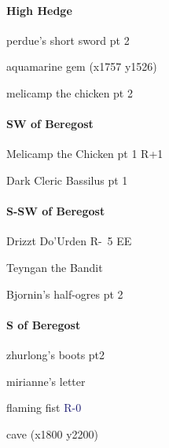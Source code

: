 \documentclass[10pt,a4,twoside]{book}
\begin{document}
\begin{multicols}{3}
\paragraph*{High Hedge}
\begin{trivlist}
\item perdue's short sword pt 2   \label{shsw} %
\item aquamarine gem (x1757 y1526)
\item melicamp the chicken pt 2   \label{wizard} %
\end{trivlist}

\paragraph*{SW of Beregost}
\begin{trivlist}
\item Melicamp the Chicken pt 1 {\textcolor{OliveGreen}{R+1}}  \label{chicken} %
\item Dark Cleric Bassilus pt 1   \label{bassilus} %
\end{trivlist}

\paragraph*{S-SW of Beregost}
\begin{trivlist}
\item Drizzt Do'Urden \textcolor{Mahogany}{R-~5} {EE}
\item Teyngan the Bandit
\item Bjornin's half-ogres pt 2  \label{halfogres} %
\end{trivlist}

\paragraph*{S of Beregost}
\begin{trivlist}
\item zhurlong's boots pt2   \label{boots} %
\item mirianne's letter   \label{letter} %
\item flaming fist \textcolor{MidnightBlue}{R-0}
\item cave (x1800 y2200)
\end{trivlist}


\end{multicols}
\end{document}
